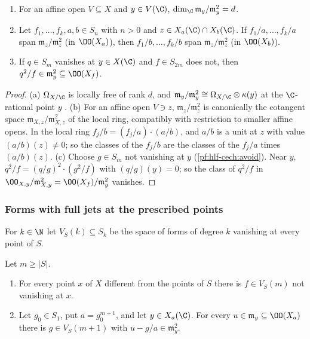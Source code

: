\begin{lemma}\label{pf:hlf-cech:cotangent}
\begin{enumerate}[label=(\alph*),nosep]
\item For an affine open $V\subseteq X$ and $y\in V(\C)$, $\dim_\C\mathfrak m_y/\mathfrak m_y^2=d$.
\item Let $f_1,\dots,f_k,a,b\in S_n$ with $n>0$ and $z\in X_a(\C)\cap X_b(\C)$. If $f_1/a,\dots,f_k/a$ span $\mathfrak m_z/\mathfrak m_z^2$ (in
  $\OO(X_a)$), then $f_1/b,\dots,f_k/b$ span $\mathfrak m_z/\mathfrak m_z^2$ (in $\OO(X_b)$).
\item If $q\in S_m$ vanishes at $y\in X(\C)$ and $f\in S_{2m}$ does not, then $q^2/f\in\mathfrak m_y^2\subseteq\OO(X_f)$.
\end{enumerate}
\end{lemma}

\begin{proof}
(a) $\Omega_{X/\C}$ is locally free of rank $d$, and $\mathfrak m_y/\mathfrak m_y^2\cong\Omega_{X/\C}\otimes\kappa(y)$ at the $\C$-rational point
$y$ \cite[Prop.~II.8.7, Thm.~II.8.15]{Hartshorne1977}. (b) For an affine open $V\ni z$, $\mathfrak m_z/\mathfrak m_z^2$ is canonically the cotangent
space $\mathfrak m_{X,z}/\mathfrak m_{X,z}^2$ of the local ring, compatibly with restriction to smaller affine opens. In the local ring
$f_j/b=(f_j/a)\cdot(a/b)$, and $a/b$ is a unit at $z$ with value $(a/b)(z)\ne0$; so the classes of the $f_j/b$ are the classes of the $f_j/a$ times
$(a/b)(z)$. (c) Choose $g\in S_m$ not vanishing at $y$ (\cref{pf:hlf-cech:avoid}). Near $y$, $q^2/f=(q/g)^2\cdot(g^2/f)$ with
$(q/g)(y)=0$; so the class of $q^2/f$ in $\OO_{X,y}/\mathfrak m_{X,y}^2=\OO(X_f)/\mathfrak m_y^2$ vanishes.
\end{proof}

\subsubsection{Forms with full jets at the prescribed points}
For $k\in\N$ let $V_S(k)\subseteq S_k$ be the space of forms of degree $k$ vanishing at every point of $S$.

\begin{lemma}\label{pf:hlf-cech:sep}
Let $m\ge|S|$.
\begin{enumerate}[label=(\alph*),nosep]
\item For every point $x$ of $X$ different from the points of $S$ there is $f\in V_S(m)$ not vanishing at $x$.
\item Let $g_0\in S_1$, put $a=g_0^{m+1}$, and let $y\in X_a(\C)$. For every $u\in\mathfrak m_y\subseteq\OO(X_a)$ there is
  $g\in V_S(m+1)$ with $u-g/a\in\mathfrak m_y^2$.
\end{enumerate}
\end{lemma}

